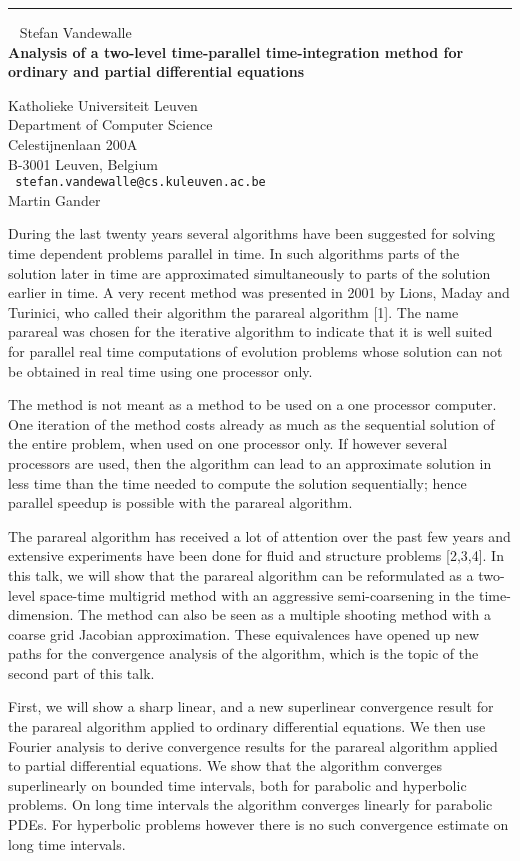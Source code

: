 \documentclass{report}
\begin{document}
\begin{center}

\rule{6in}{1pt} \
{\large
Stefan Vandewalle
\\ {\bf
Analysis of a two-level time-parallel time-integration method
for ordinary and partial differential equations
}}


Katholieke Universiteit Leuven \\
Department of Computer Science \\
Celestijnenlaan 200A \\
B-3001 Leuven, Belgium
\\ {\tt
stefan.vandewalle@cs.kuleuven.ac.be
}
\\
Martin Gander
\end{center}

During the last twenty years several algorithms have been suggested
for solving time dependent problems parallel in time. In such
algorithms parts of the solution later in time are approximated
simultaneously to parts of the solution earlier in time. A very recent
method was presented in 2001 by Lions, Maday and Turinici, who called
their algorithm the parareal algorithm [1]. The name parareal was
chosen for the iterative algorithm to indicate that it is well suited
for parallel real time computations of evolution problems whose
solution can not be obtained in real time using one processor only.

The method is not meant as a method to be used on a one processor
computer. One iteration of the method costs already as much as the
sequential solution of the entire problem, when used on one processor
only. If however several processors are used, then the algorithm can
lead to an approximate solution in less time than the time needed to
compute the solution sequentially; hence parallel speedup is possible
with the parareal algorithm.

The parareal algorithm has received a lot of attention over the past
few years and extensive experiments have been done for fluid and
structure problems [2,3,4]. In this talk, we will show that the
parareal algorithm can be reformulated as a two-level space-time
multigrid method with an aggressive semi-coarsening in the
time-dimension. The method can also be seen as a multiple shooting
method with a coarse grid Jacobian approximation. These equivalences
have opened up new paths for the convergence analysis of the
algorithm, which is the topic of the second part of this talk.

First, we will show a sharp linear, and a new superlinear convergence
result for the parareal algorithm applied to ordinary differential
equations. We then use Fourier analysis to derive convergence results
for the parareal algorithm applied to partial differential equations.
We show that the algorithm converges superlinearly on bounded time
intervals, both for parabolic and hyperbolic problems. On long time
intervals the algorithm converges linearly for parabolic PDEs. For
hyperbolic problems however there is no such convergence estimate on
long time intervals.
\end{document}

